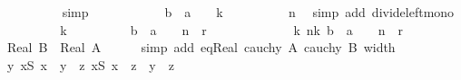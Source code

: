 \begin{isabellebody}
\ \ \ \ \ \ \ \ \isamarkupfalse%
\ simp\isanewline
\ \ \ \ \ \ \isamarkupfalse%
\ \isamarkupfalse%
\ {\isachardoublequoteopen}{\isasymdots}\ {\isasymle}\ {\isasymbar}b\ {\isacharminus}{\kern0pt}\ a{\isasymbar}\ {\isacharslash}{\kern0pt}\ {}\ {\isacharcircum}{\kern0pt}\ k{\isachardoublequoteclose}\isanewline
\ \ \ \ \ \ \ \ \isamarkupfalse%
\ n\ \isamarkupfalse%
\ {\isacharparenleft}{\kern0pt}simp\ add{\isacharcolon}{\kern0pt}\ divide{\isacharunderscore}{\kern0pt}left{\isacharunderscore}{\kern0pt}mono{\isacharparenright}{\kern0pt}\isanewline
\ \ \ \ \ \ \isamarkupfalse%
\ \isamarkupfalse%
\ k\isanewline
\ \ \ \ \ \ \isamarkupfalse%
\ \isamarkupfalse%
\ {\isachardoublequoteopen}{\isasymbar}{\isacharparenleft}{\kern0pt}b\ {\isacharminus}{\kern0pt}\ a{\isacharparenright}{\kern0pt}\ {\isacharslash}{\kern0pt}\ {}\ {\isacharcircum}{\kern0pt}\ n{\isasymbar}\ {\isacharless}{\kern0pt}\ r{\isachardoublequoteclose}\ \isacommand{{\isachardot}{\kern0pt}}\isamarkupfalse%
\isanewline
\ \ \ \ \isamarkupfalse%
\isanewline
\ \ \ \ \isamarkupfalse%
\ \isamarkupfalse%
\ {\isachardoublequoteopen}{\isasymexists}k{\isachardot}{\kern0pt}\ {\isasymforall}n{\isasymge}k{\isachardot}{\kern0pt}\ {\isasymbar}{\isacharparenleft}{\kern0pt}b\ {\isacharminus}{\kern0pt}\ a{\isacharparenright}{\kern0pt}\ {\isacharslash}{\kern0pt}\ {}\ {\isacharcircum}{\kern0pt}\ n{\isasymbar}\ {\isacharless}{\kern0pt}\ r{\isachardoublequoteclose}\ \isacommand{{\isachardot}{\kern0pt}{\isachardot}{\kern0pt}}\isamarkupfalse%
\isanewline
\ \ \isamarkupfalse%
\isanewline
\ \ \isamarkupfalse%
\ \isamarkupfalse%
\ {\isachardoublequoteopen}Real\ B\ {\isacharequal}{\kern0pt}\ Real\ A{\isachardoublequoteclose}\isanewline
\ \ \ \ \isamarkupfalse%
\ {\isacharparenleft}{\kern0pt}simp\ add{\isacharcolon}{\kern0pt}\ eq{\isacharunderscore}{\kern0pt}Real\ {\isacartoucheopen}cauchy\ A{\isacartoucheclose}\ {\isacartoucheopen}cauchy\ B{\isacartoucheclose}\ width{\isacharparenright}{\kern0pt}\isanewline
\ \ \isamarkupfalse%
\ \isamarkupfalse%
\ {\isachardoublequoteopen}{\isasymexists}y{\isachardot}{\kern0pt}\ {\isacharparenleft}{\kern0pt}{\isasymforall}x{\isasymin}S{\isachardot}{\kern0pt}\ x\ {\isasymle}\ y{\isacharparenright}{\kern0pt}\ {\isasymand}\ {\isacharparenleft}{\kern0pt}{\isasymforall}z{\isachardot}{\kern0pt}\ {\isacharparenleft}{\kern0pt}{\isasymforall}x{\isasymin}S{\isachardot}{\kern0pt}\ x\ {\isasymle}\ z{\isacharparenright}{\kern0pt}\ {\isasymlongrightarrow}\ y\ {\isasymle}\ z{\isacharparenright}{\kern0pt}{\isachardoublequoteclose}\isanewline

\end{isabellebody}
